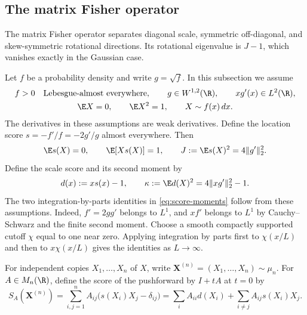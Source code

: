 \subsection{The matrix Fisher operator}
\label{sec:fisher-operator}

The matrix Fisher operator separates diagonal scale, symmetric off-diagonal,
and skew-symmetric rotational directions.  Its rotational eigenvalue is
\(J-1\), which vanishes exactly in the Gaussian case.

Let $f$ be a probability density and write $g=\sqrt f$.
In this subsection we assume
\begin{equation}
 \begin{gathered}
 f>0\quad\text{Lebesgue-almost everywhere},\qquad
 g\in W^{1,2}(\R),\qquad xg'(x)\in L^2(\R),\\
 \E X=0,\qquad \E X^2=1,
 \qquad X\sim f(x)\,dx.
 \end{gathered}
 \label{eq:fisher-regularity}
\end{equation}
The derivatives in these assumptions are weak derivatives.
Define the location score $s=-f'/f=-2g'/g$ almost everywhere.  Then
\begin{equation}
 \E s(X)=0,\qquad \E[Xs(X)]=1,\qquad
 J:=\E s(X)^2=4\|g'\|_2^2.
 \label{eq:score-moments}
\end{equation}
Define the scale score and its second moment by
\begin{equation}
 d(x):=xs(x)-1,\qquad
 \kappa:=\E d(X)^2=4\|xg'\|_2^2-1.
 \label{eq:kappa}
\end{equation}
The two integration-by-parts identities in
\eqref{eq:score-moments} follow from these assumptions.
Indeed,
$f'=2gg'$ belongs to $L^1$, and $xf'$ belongs to $L^1$ by
Cauchy--Schwarz and the finite second moment.  Choose a smooth compactly
supported cutoff $\chi$ equal to one near zero.  Applying integration by
parts first to $\chi(x/L)$ and then to
$x\chi(x/L)$ gives the identities as $L\to\infty$.

For independent copies $X_1,\ldots,X_n$ of $X$, write
$\mathbf X^{(n)}=(X_1,\ldots,X_n)\sim\mu_n$.  For
$A\in M_n(\R)$, define the score of the pushforward by $I+tA$ at $t=0$ by
\begin{equation}
 S_A(\mathbf X^{(n)})=\sum_{i,j=1}^n A_{ij}
       \bigl(s(X_i)X_j-\delta_{ij}\bigr)
       =\sum_i A_{ii}d(X_i)+\sum_{i\ne j}A_{ij}s(X_i)X_j.
 \label{eq:matrix-score}
\end{equation}

